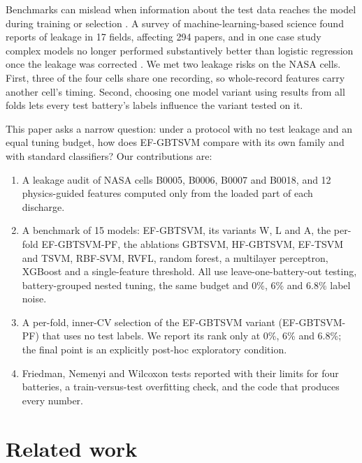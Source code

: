 \documentclass[conference,a4paper]{IEEEtran}
\begin{document}
Benchmarks can mislead when information about the test data reaches the model during training or selection \cite{r15}. A survey of machine-learning-based science found reports of leakage in 17 fields, affecting 294 papers, and in one case study complex models no longer performed substantively better than logistic regression once the leakage was corrected \cite{r26}. We met two leakage risks on the NASA cells. First, three of the four cells share one recording, so whole-record features carry another cell's timing. Second, choosing one model variant using results from all folds lets every test battery's labels influence the variant tested on it.

This paper asks a narrow question: under a protocol with no test leakage and an equal tuning budget, how does EF-GBTSVM compare with its own family and with standard classifiers? Our contributions are:

\begin{enumerate}
\item A leakage audit of NASA cells B0005, B0006, B0007 and B0018, and 12 physics-guided features computed only from the loaded part of each discharge.
\item A benchmark of 15 models: EF-GBTSVM, its variants W, L and A, the per-fold EF-GBTSVM-PF, the ablations GBTSVM, HF-GBTSVM, EF-TSVM and TSVM, RBF-SVM, RVFL, random forest, a multilayer perceptron, XGBoost and a single-feature threshold. All use leave-one-battery-out testing, battery-grouped nested tuning, the same budget and 0\%, 6\% and 6.8\% label noise.
\item A per-fold, inner-CV selection of the EF-GBTSVM variant (EF-GBTSVM-PF) that uses no test labels. We report its rank only at 0\%, 6\% and 6.8\%; the final point is an explicitly post-hoc exploratory condition.
\item Friedman, Nemenyi and Wilcoxon tests reported with their limits for four batteries, a train-versus-test overfitting check, and the code that produces every number.
\end{enumerate}

\section{Related work}
\end{document}
